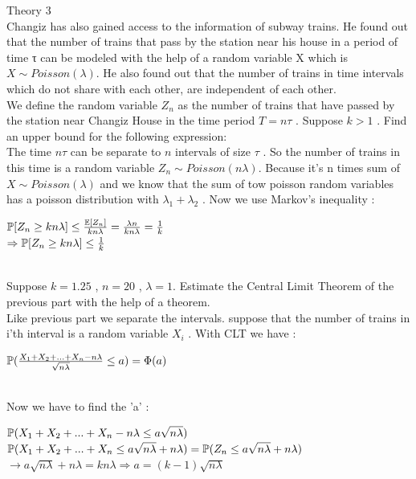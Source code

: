 \documentclass[30pt]{article}
\begin{document}
{\Large \color{blue} Theory 3 } \\
{\color{blue} Changiz has also gained access to the information of subway trains. He found out that the number of trains that pass by the station near his house in a period of time τ can be modeled with the help of a random variable X which is $X \sim Poisson(\lambda)$. He also found out that the number of trains in time intervals which do not share with each other, are independent of each other. \\ } \newline
{\color{blue}{\large  1.} We define the random variable $Z_n$ as the number of trains that have passed by the station near Changiz House in the time period $T = n\tau$ . Suppose $k > 1$ . Find an upper bound for the following expression: } \\ \newline
The time $n\tau$ can be separate to $n$ intervals of size $\tau$ . So the number of trains in this time is a random variable $Z_n \sim Poisson(n\lambda)$. Because it's n times sum of $X \sim Poisson(\lambda)$ and we know that the sum of tow poisson random variables has a poisson distribution with $\lambda_1 + \lambda_2 $ . Now we use Markov's inequality : \\
\begin{center}
    $\Bbb{P}[Z_n \ge kn\lambda] \le \frac{\Bbb{E}[Z_n]}{kn\lambda} = \frac{\lambda n}{kn\lambda} = \frac{1}{k}$ \vspace{0.25cm} \\
    $\Rightarrow \Bbb{P}[Z_n \ge kn\lambda]  \le \frac{1}{k}$
\end{center} \\ \newline
{\color{blue}{\large  2.} Suppose $k = 1.25$ , $n = 20$ , $\lambda = 1 $. Estimate the Central Limit Theorem of the previous part with the help of a theorem. } \\ \newline
Like previous part we separate the intervals. suppose that the number of trains in i'th interval is a random variable $X_i$ . With CLT we have : \\ 
\begin{center}
    $\Bbb{P}(\frac{X_1+X_2+...+X_n - n\lambda}{\sqrt{n\lambda}} \le a ) = \Phi(a) $
\end{center} \\
Now we have to find the 'a' : \\
\begin{center}
    $\Bbb{P}(X_1+X_2+...+X_n - n\lambda \le a\sqrt{n\lambda} ) $ \vspace{0.25cm} \\
    $\Bbb{P}(X_1+X_2+...+X_n \le a\sqrt{n\lambda} + n\lambda ) =\Bbb{P}(Z_n \le a\sqrt{n\lambda} + n\lambda )$ \vspace{0.25cm} \\
    $\rightarrow a\sqrt{n\lambda} + n\lambda  = kn\lambda \Rightarrow a = (k-1)\sqrt{n\lambda} $ \vspace{0.25cm} \\
\end{center} \\
\end{document}
